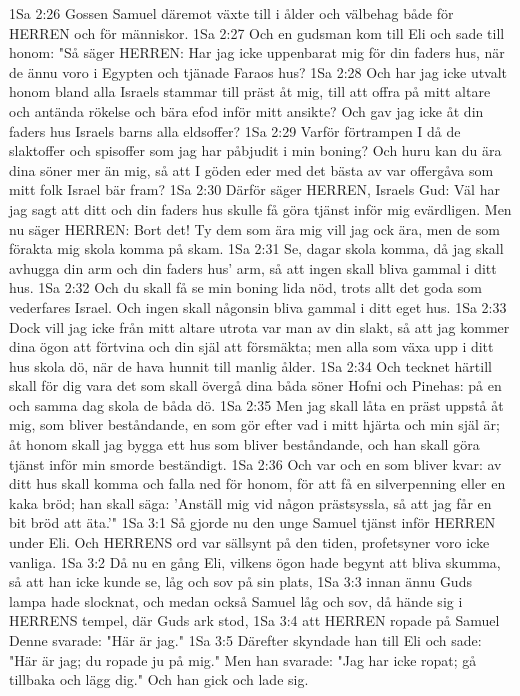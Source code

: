 1Sa 2:26  Gossen Samuel däremot växte till i ålder och välbehag både för HERREN och för människor.
1Sa 2:27  Och en gudsman kom till Eli och sade till honom: "Så säger HERREN: Har jag icke uppenbarat mig för din faders hus, när de ännu voro i Egypten och tjänade Faraos hus?
1Sa 2:28  Och har jag icke utvalt honom bland alla Israels stammar till präst åt mig, till att offra på mitt altare och antända rökelse och bära efod inför mitt ansikte? Och gav jag icke åt din faders hus Israels barns alla eldsoffer?
1Sa 2:29  Varför förtrampen I då de slaktoffer och spisoffer som jag har påbjudit i min boning? Och huru kan du ära dina söner mer än mig, så att I göden eder med det bästa av var offergåva som mitt folk Israel bär fram?
1Sa 2:30  Därför säger HERREN, Israels Gud: Väl har jag sagt att ditt och din faders hus skulle få göra tjänst inför mig evärdligen. Men nu säger HERREN: Bort det! Ty dem som ära mig vill jag ock ära, men de som förakta mig skola komma på skam.
1Sa 2:31  Se, dagar skola komma, då jag skall avhugga din arm och din faders hus' arm, så att ingen skall bliva gammal i ditt hus.
1Sa 2:32  Och du skall få se min boning lida nöd, trots allt det goda som vederfares Israel. Och ingen skall någonsin bliva gammal i ditt eget hus.
1Sa 2:33  Dock vill jag icke från mitt altare utrota var man av din slakt, så att jag kommer dina ögon att förtvina och din själ att försmäkta; men alla som växa upp i ditt hus skola dö, när de hava hunnit till manlig ålder.
1Sa 2:34  Och tecknet härtill skall för dig vara det som skall övergå dina båda söner Hofni och Pinehas: på en och samma dag skola de båda dö.
1Sa 2:35  Men jag skall låta en präst uppstå åt mig, som bliver beståndande, en som gör efter vad i mitt hjärta och min själ är; åt honom skall jag bygga ett hus som bliver beståndande, och han skall göra tjänst inför min smorde beständigt.
1Sa 2:36  Och var och en som bliver kvar: av ditt hus skall komma och falla ned för honom, för att få en silverpenning eller en kaka bröd; han skall säga: 'Anställ mig vid någon prästsyssla, så att jag får en bit bröd att äta.'"
1Sa 3:1  Så gjorde nu den unge Samuel tjänst inför HERREN under Eli. Och HERRENS ord var sällsynt på den tiden, profetsyner voro icke vanliga.
1Sa 3:2  Då nu en gång Eli, vilkens ögon hade begynt att bliva skumma, så att han icke kunde se, låg och sov på sin plats,
1Sa 3:3  innan ännu Guds lampa hade slocknat, och medan också Samuel låg och sov, då hände sig i HERRENS tempel, där Guds ark stod,
1Sa 3:4  att HERREN ropade på Samuel Denne svarade: "Här är jag."
1Sa 3:5  Därefter skyndade han till Eli och sade: "Här är jag; du ropade ju på mig." Men han svarade: "Jag har icke ropat; gå tillbaka och lägg dig." Och han gick och lade sig.
